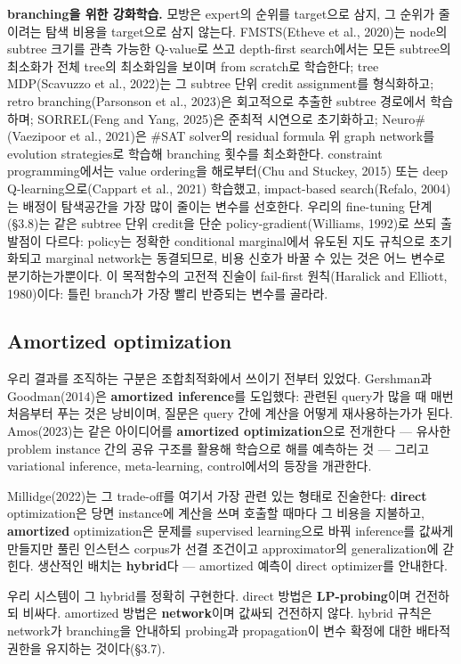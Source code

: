 \documentclass[final,5p,twocolumn]{elsarticle}
\begin{document}
\textbf{branching을 위한 강화학습.} 모방은 expert의 순위를 target으로 삼지, 그 순위가 줄이려는 탐색 비용을 target으로 삼지 않는다. FMSTS(Etheve et al., 2020)는 node의 subtree 크기를 관측 가능한 Q-value로 쓰고 depth-first search에서는 모든 subtree의 최소화가 전체 tree의 최소화임을 보이며 from scratch로 학습한다; tree MDP(Scavuzzo et al., 2022)는 그 subtree 단위 credit assignment를 형식화하고; retro branching(Parsonson et al., 2023)은 회고적으로 추출한 subtree 경로에서 학습하며; SORREL(Feng and Yang, 2025)은 준최적 시연으로 초기화하고; Neuro\#(Vaezipoor et al., 2021)은 \#SAT solver의 residual formula 위 graph network를 evolution strategies로 학습해 branching 횟수를 최소화한다. constraint programming에서는 value ordering을 해로부터(Chu and Stuckey, 2015) 또는 deep Q-learning으로(Cappart et al., 2021) 학습했고, impact-based search(Refalo, 2004)는 배정이 탐색공간을 가장 많이 줄이는 변수를 선호한다. 우리의 fine-tuning 단계(§3.8)는 같은 subtree 단위 credit을 단순 policy-gradient(Williams, 1992)로 쓰되 출발점이 다르다: policy는 정확한 conditional marginal에서 유도된 지도 규칙으로 초기화되고 marginal network는 동결되므로, 비용 신호가 바꿀 수 있는 것은 어느 변수로 분기하는가뿐이다. 이 목적함수의 고전적 진술이 fail-first 원칙(Haralick and Elliott, 1980)이다: 틀린 branch가 가장 빨리 반증되는 변수를 골라라.

\subsection{Amortized optimization}
우리 결과를 조직하는 구분은 조합최적화에서 쓰이기 전부터 있었다. Gershman과 Goodman(2014)은 \textbf{amortized inference}를 도입했다: 관련된 query가 많을 때 매번 처음부터 푸는 것은 낭비이며, 질문은 query 간에 계산을 어떻게 재사용하는가가 된다. Amos(2023)는 같은 아이디어를 \textbf{amortized optimization}으로 전개한다 — 유사한 problem instance 간의 공유 구조를 활용해 학습으로 해를 예측하는 것 — 그리고 variational inference, meta-learning, control에서의 등장을 개관한다.

Millidge(2022)는 그 trade-off를 여기서 가장 관련 있는 형태로 진술한다: \textbf{direct} optimization은 당면 instance에 계산을 쓰며 호출할 때마다 그 비용을 지불하고, \textbf{amortized} optimization은 문제를 supervised learning으로 바꿔 inference를 값싸게 만들지만 풀린 인스턴스 corpus가 선결 조건이고 approximator의 generalization에 갇힌다. 생산적인 배치는 \textbf{hybrid}다 — amortized 예측이 direct optimizer를 안내한다.

우리 시스템이 그 hybrid를 정확히 구현한다. direct 방법은 \textbf{LP-probing}이며 건전하되 비싸다. amortized 방법은 \textbf{network}이며 값싸되 건전하지 않다. hybrid 규칙은 network가 branching을 안내하되 probing과 propagation이 변수 확정에 대한 배타적 권한을 유지하는 것이다(§3.7).
\end{document}
